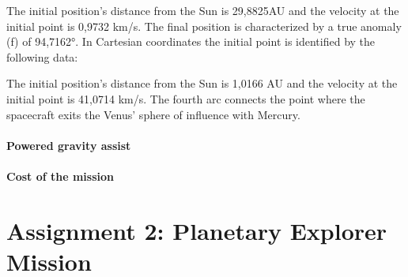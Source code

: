\documentclass[11pt,a4paper]{report}
\begin{document}
The initial position’s distance from the Sun is 29,8825AU and the velocity at the initial point is 0,9732 km/s.
The final position is characterized by a true anomaly (f) of 94,7162°. In Cartesian coordinates the initial point is identified by the following data:

\begin{table}[H]
\centering
{}
\end{table}

The initial position’s distance from the Sun is 1,0166 AU and the velocity at the initial point is 41,0714 km/s.
The fourth arc connects the point where the spacecraft exits the Venus’ sphere of influence with Mercury.


\subsection{Powered gravity assist}

\subsection{Cost of the mission}

\part{Assignment 2: Planetary Explorer Mission}
\end{document}
